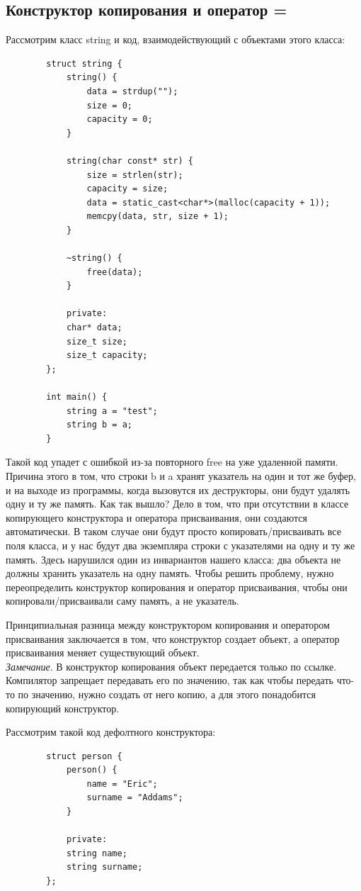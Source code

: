 \documentclass[12pt, a4paper]{article}
\begin{document}
	\subsection{Конструктор копирования и оператор =}
	Рассмотрим класс string и код, взаимодействующий с объектами этого класса:
	\begin{verbatim}
		struct string {
			string() {
				data = strdup("");
				size = 0;
				capacity = 0;
			}
			
			string(char const* str) {
				size = strlen(str);
				capacity = size;
				data = static_cast<char*>(malloc(capacity + 1));
				memcpy(data, str, size + 1);
			}
			
			~string() {
				free(data);
			}
			
			private:
			char* data;
			size_t size;
			size_t capacity;
		};
		
		int main() {
			string a = "test";
			string b = a;
		}
	\end{verbatim}
	Такой код упадет с ошибкой из-за повторного free на уже удаленной памяти. Причина этого в том, что строки b и a хранят указатель на один и тот же буфер, и на выходе из программы, когда вызовутся их деструкторы, они будут удалять одну и ту же память. Как так вышло? Дело в том, что при отсутствии в классе копирующего конструктора и оператора присваивания, они создаются автоматически. В таком случае они будут просто копировать/присваивать все поля класса, и у нас будут два экземпляра строки с указателями на одну и ту же память. Здесь нарушился один из инвариантов нашего класса: два объекта не должны хранить указатель на одну память. Чтобы решить проблему, нужно переопределить конструктор копирования и оператор присваивания, чтобы они копировали/присваивали саму память, а не указатель.  
	\\\par Принципиальная разница между конструктором копирования и оператором присваивания заключается в том, что конструктор создает объект, а оператор присваивания меняет существующий объект. \\
	\textit{Замечание}. В конструктор копирования объект передается только по ссылке. Компилятор запрещает передавать его по значению, так как чтобы передать что-то по значению, нужно создать от него копию, а для этого понадобится копирующий конструктор.
	\\\par Рассмотрим такой код дефолтного конструктора:
	\begin{verbatim}
		struct person {
			person() {
				name = "Eric";
				surname = "Addams";
			}
			
			private:
			string name;
			string surname;
		};
	\end{verbatim}
\end{document}
